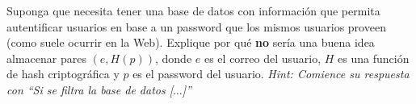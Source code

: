
Suponga que necesita tener una base de datos con información que permita autentificar usuarios en base a un password que los mismos usuarios proveen (como suele ocurrir en la Web). Explique
por qué \textbf{no} sería una buena idea almacenar pares $(e,H(p))$, donde $e$ es el correo del usuario, $H$ es una función de hash criptográfica y $p$ es el password del usuario. \textit{Hint: Comience su respuesta con ``Si se filtra la base de datos [$\ldots$]''}
